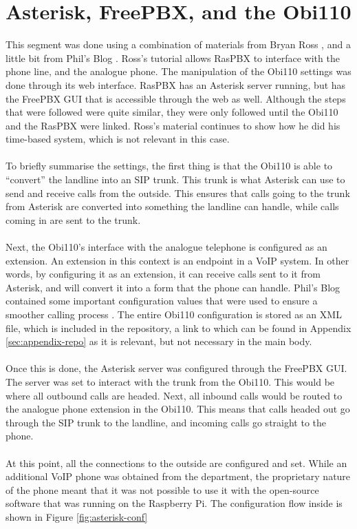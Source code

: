 \documentclass[main.tex]{subfiles}
\begin{document}
\section{Asterisk, FreePBX, and the Obi110}
This segment was done using a combination of materials from Bryan Ross \cite{bryanross}, and a little bit from Phil's Blog \cite{obihaiuk}. Ross's tutorial \cite{bryanross} allows RasPBX to interface with the phone line, and the analogue phone. The manipulation of the Obi110 settings was done through its web interface. RasPBX has an Asterisk server running, but has the FreePBX GUI that is accessible through the web as well. Although the steps that were followed were quite similar, they were only followed until the Obi110 and the RasPBX were linked. Ross's material continues to show how he did his time-based system, which is not relevant in this case.
\\\\
To briefly summarise the settings, the first thing is that the Obi110 is able to ``convert'' the landline into an SIP trunk. This trunk is what Asterisk can use to send and receive calls from the outside. This ensures that calls going to the trunk from Asterisk are converted into something the landline can handle, while calls coming in are sent to the trunk.
\\\\
Next, the Obi110's interface with the analogue telephone is configured as an extension. An extension in this context is an endpoint in a VoIP system. In other words, by configuring it as an extension, it can receive calls sent to it from Asterisk, and will convert it into a form that the phone can handle. Phil's Blog contained some important configuration values that were used to ensure a smoother calling process \cite{obihaiuk}. The entire Obi110 configuration is stored as an XML file, which is included in the repository, a link to which can be found in Appendix \ref{sec:appendix-repo} as it is relevant, but not necessary in the main body.
\\\\
Once this is done, the Asterisk server was configured through the FreePBX GUI. The server was set to interact with the trunk from the Obi110. This would be where all outbound calls are headed. Next, all inbound calls would be routed to the analogue phone extension in the Obi110. This means that calls headed out go through the SIP trunk to the landline, and incoming calls go straight to the phone.
\\\\
At this point, all the connections to the outside are configured and set. While an additional VoIP phone was obtained from the department, the proprietary nature of the phone meant that it was not possible to use it with the open-source software that was running on the Raspberry Pi. The configuration flow inside is shown in Figure \ref{fig:asterisk-conf}
\end{document}
